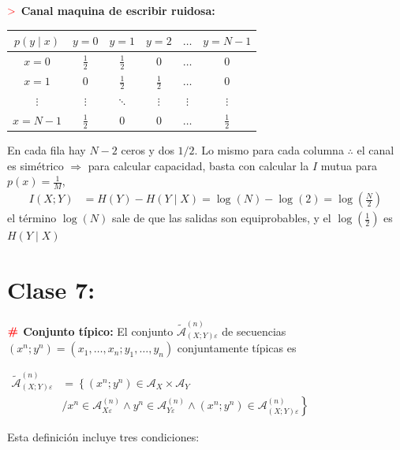 \documentclass[%
 reprint,
 amsmath,amssymb,
 aps,
]{revtex4-1}
\begin{document}
\textbf{$\textcolor{red}{\mathbf{>}}$ Canal maquina de escribir ruidosa:}

\begin{tabular}{c|ccccc}
  $p(y \mid x)$ & $y=0$ & $y=1$ & $y=2$ & $\ldots$ & $y=N-1$ \\
  \hline$x=0$ & $\frac{1}{2}$ & $\frac{1}{2}$ & 0 & $\ldots$ & 0 \\
  $x=1$ & 0 & $\frac{1}{2}$ & $\frac{1}{2}$ & $\ldots$ & 0 \\
  $\vdots$ & $\vdots$ & $\ddots$ & $\vdots$ & $\vdots$ & $\vdots$ \\
  $x=N-1$ & $\frac{1}{2}$ & 0 & 0 & $\ldots$ & $\frac{1}{2}$
\end{tabular}

En cada fila hay $N-2$ ceros y dos $1 / 2$. Lo mismo para cada columna $\boldsymbol{\therefore}$ el canal es simétrico $\Rightarrow$ para calcular capacidad, basta con calcular la $I$ mutua para $p(x)=\frac{1}{M}$,
$$
\begin{aligned}
I(X ; Y) &=H(Y)-H(Y \mid X) =\log (N)-\log (2) =\log \left(\frac{N}{2}\right)
\end{aligned}
$$
el término $\log (N)$ sale de que las salidas son equiprobables, y el $\log (\frac{1}{2})$ es $H(Y \mid X)$

\section{Clase 7:}

\textbf{$\color{red}{\textbf{\#}}$ Conjunto típico:} 
El conjunto $\tilde{\mathcal{A}}_{(X ; Y) \varepsilon}^{(n)}$ de secuencias $\left(x^{n} ; y^{n}\right)=\left(x_{1}, \ldots, x_{n} ; y_{1}, \ldots, y_{n}\right)$ conjuntamente típicas es

$
\begin{aligned}
  \tilde{\mathcal{A}}_{(X ; Y) \varepsilon}^{(n)} &=
  \left\{  \left(x^{n} ; y^{n}\right) \in \mathcal{A}_{X} \times \mathcal{A}_{Y} \right. \\
          & \left.  /  x^{n} \in \mathcal{A}_{X \varepsilon}^{(n)} \wedge y^{n} \in \mathcal{A}_{Y \varepsilon}^{(n)} \wedge\left(x^{n} ; y^{n}\right) \in \mathcal{A}_{(X ; Y) \varepsilon}^{(n)}\right\} 
\end{aligned}
$

Esta definición incluye tres condiciones:
\end{document}
